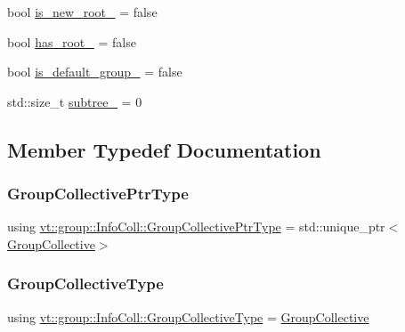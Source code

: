 \begin{DoxyCompactItemize}
\item 
bool \hyperlink{structvt_1_1group_1_1_info_coll_a51b12694202a7bef872694ed9b2f6be3}{is\+\_\+new\+\_\+root\+\_\+} = false
\item 
bool \hyperlink{structvt_1_1group_1_1_info_coll_abc9bebfacc0a99ea16893fce55bf8ffe}{has\+\_\+root\+\_\+} = false
\item 
bool \hyperlink{structvt_1_1group_1_1_info_coll_ab08014fe1c28b172fc4b2b68a5fbc2a1}{is\+\_\+default\+\_\+group\+\_\+} = false
\item 
std\+::size\+\_\+t \hyperlink{structvt_1_1group_1_1_info_coll_a42a225abb3f2d734ae4eddaecdb56b9e}{subtree\+\_\+} = 0
\end{DoxyCompactItemize}


\subsection{Member Typedef Documentation}
\mbox{\label{structvt_1_1group_1_1_info_coll_a96f3e779eb522034ee3db6c93b3f4c6b}} 
\subsubsection{\texorpdfstring{Group\+Collective\+Ptr\+Type}{GroupCollectivePtrType}}
{\footnotesize\ttfamily using \hyperlink{structvt_1_1group_1_1_info_coll_a96f3e779eb522034ee3db6c93b3f4c6b}{vt\+::group\+::\+Info\+Coll\+::\+Group\+Collective\+Ptr\+Type} =  std\+::unique\+\_\+ptr$<$\hyperlink{structvt_1_1group_1_1_group_collective}{Group\+Collective}$>$}

\mbox{\label{structvt_1_1group_1_1_info_coll_a49957a600d853362ccc55f1ad9d1b173}} 
\subsubsection{\texorpdfstring{Group\+Collective\+Type}{GroupCollectiveType}}
{\footnotesize\ttfamily using \hyperlink{structvt_1_1group_1_1_info_coll_a49957a600d853362ccc55f1ad9d1b173}{vt\+::group\+::\+Info\+Coll\+::\+Group\+Collective\+Type} =  \hyperlink{structvt_1_1group_1_1_group_collective}{Group\+Collective}}

